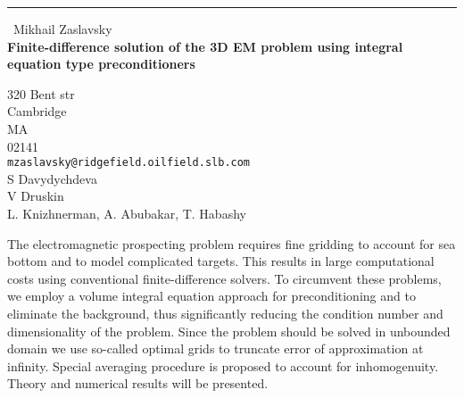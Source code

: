 \documentclass{report}
\begin{document}
\begin{center}
\rule{6in}{1pt} \
{\large Mikhail Zaslavsky \\
{\bf Finite-difference solution of the 3D EM problem using integral equation type preconditioners}}

320 Bent str  \\ Cambridge \\ MA \\ 02141
\\
{\tt mzaslavsky@ridgefield.oilfield.slb.com}\\
S Davydychdeva\\
V Druskin\\
	L. Knizhnerman, A. Abubakar, T. Habashy\end{center}

The electromagnetic prospecting problem requires fine gridding to account
for sea bottom and to model complicated targets. This results in large
computational costs using conventional finite-difference solvers. To
circumvent these problems, we employ a volume integral equation approach
for preconditioning and to eliminate the background, thus significantly
reducing the condition number and dimensionality of the problem. Since
the problem should be solved in unbounded domain we use so-called optimal
grids to truncate error of approximation at infinity. Special averaging
procedure is proposed to account for inhomogenuity. Theory and numerical
results will be presented.
\end{document}
